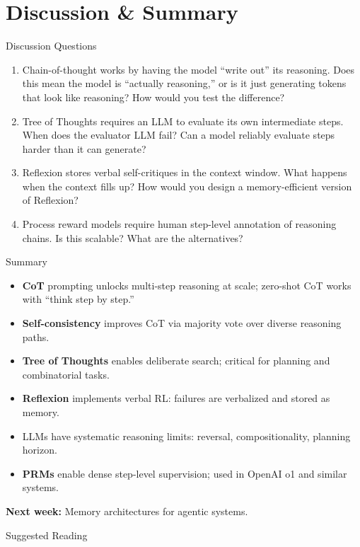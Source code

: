 \documentclass[aspectratio=169,10pt]{beamer}
\begin{document}
\section{Discussion \& Summary}
\begin{frame}{Discussion Questions}
  \begin{enumerate}
    \item Chain-of-thought works by having the model ``write out'' its reasoning. Does this mean the model is ``actually reasoning,'' or is it just generating tokens that look like reasoning? How would you test the difference?
    \item Tree of Thoughts requires an LLM to evaluate its own intermediate steps. When does the evaluator LLM fail? Can a model reliably evaluate steps harder than it can generate?
    \item Reflexion stores verbal self-critiques in the context window. What happens when the context fills up? How would you design a memory-efficient version of Reflexion?
    \item Process reward models require human step-level annotation of reasoning chains. Is this scalable? What are the alternatives?
  \end{enumerate}
\end{frame}

\begin{frame}{Summary}
  \begin{itemize}
    \item \textbf{CoT} prompting unlocks multi-step reasoning at scale; zero-shot CoT works with ``think step by step.''
    \item \textbf{Self-consistency} improves CoT via majority vote over diverse reasoning paths.
    \item \textbf{Tree of Thoughts} enables deliberate search; critical for planning and combinatorial tasks.
    \item \textbf{Reflexion} implements verbal RL: failures are verbalized and stored as memory.
    \item LLMs have systematic reasoning limits: reversal, compositionality, planning horizon.
    \item \textbf{PRMs} enable dense step-level supervision; used in OpenAI o1 and similar systems.
  \end{itemize}
  \vspace{0.3em}
  \textbf{Next week:} Memory architectures for agentic systems.
\end{frame}

\begin{frame}[allowframebreaks]{Suggested Reading}
  \nocite{wei2022chain, yao2023tree, shinn2023reflexion, wang2023selfconsistency}
  
\end{frame}
\end{document}
